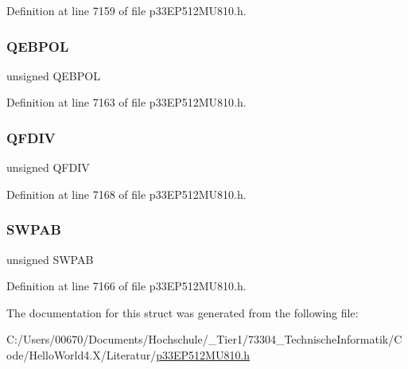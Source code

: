 Definition at line 7159 of file p33\+E\+P512\+M\+U810.\+h.

\mbox{\label{structtag_q_e_i2_i_o_c_b_i_t_s_acc4d6b7648aba40233c55b8e2fbd3b70}} 
\subsubsection{\texorpdfstring{Q\+E\+B\+P\+OL}{QEBPOL}}
{\footnotesize\ttfamily unsigned Q\+E\+B\+P\+OL}



Definition at line 7163 of file p33\+E\+P512\+M\+U810.\+h.

\mbox{\label{structtag_q_e_i2_i_o_c_b_i_t_s_a22d6fb9c6c4624daa74340826a9a06cb}} 
\subsubsection{\texorpdfstring{Q\+F\+D\+IV}{QFDIV}}
{\footnotesize\ttfamily unsigned Q\+F\+D\+IV}



Definition at line 7168 of file p33\+E\+P512\+M\+U810.\+h.

\mbox{\label{structtag_q_e_i2_i_o_c_b_i_t_s_ac733d4f6fbe27b15c7b2968f3b544589}} 
\subsubsection{\texorpdfstring{S\+W\+P\+AB}{SWPAB}}
{\footnotesize\ttfamily unsigned S\+W\+P\+AB}



Definition at line 7166 of file p33\+E\+P512\+M\+U810.\+h.



The documentation for this struct was generated from the following file\+:\begin{DoxyCompactItemize}
\item 
C\+:/\+Users/00670/\+Documents/\+Hochschule/\+\_\+\+Tier1/73304\+\_\+\+Technische\+Informatik/\+Code/\+Hello\+World4.\+X/\+Literatur/\hyperlink{p33_e_p512_m_u810_8h}{p33\+E\+P512\+M\+U810.\+h}\end{DoxyCompactItemize}
